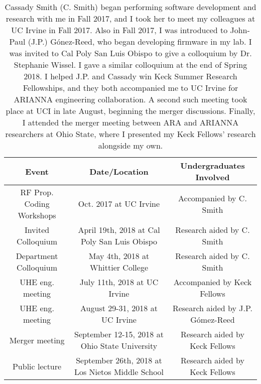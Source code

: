 \documentclass[../../main.tex]{subfiles}
\begin{document}
\begin{table}
\small
\centering
\begin{tabular}{|c|c|c|}
\hline \hline
Event & Date/Location & Undergraduates Involved \\ \hline
RF Prop. Coding Workshops & Oct. 2017 at UC Irvine & Accompanied by C. Smith \\ \hline
Invited Colloquium & April 19th, 2018 at Cal Poly San Luis Obispo & Research aided by C. Smith \\ \hline
Department Colloquium & May 4th, 2018 at Whittier College & Research aided by C. Smith \\ \hline
UHE eng. meeting & July 11th, 2018 at UC Irvine & Accompanied by Keck Fellows \\ \hline
UHE eng. meeting & August 29-31, 2018 at UC Irvine & Research aided by J.P. G\'{o}mez-Reed \\ \hline
Merger meeting & September 12-15, 2018 at Ohio State University & Research aided by Keck Fellows \\ \hline
Public lecture & September 26th, 2018 at Los Nietos Middle School & Research aided by Keck Fellows \\ \hline
\hline
\end{tabular}
\caption{\label{tab:conf} Cassady Smith (C. Smith) began performing software development and research with me in Fall 2017, and I took her to meet my colleagues at UC Irvine in Fall 2017. Also in Fall 2017, I was introduced to John-Paul (J.P.) G\'{o}nez-Reed, who began developing firmware in my lab.  I was invited to Cal Poly San Luis Obispo to give a colloquium by Dr. Stephanie Wissel.  I gave a similar colloquium at the end of Spring 2018.  I helped J.P. and Cassady win Keck Summer Research Fellowships, and they both accompanied me to UC Irvine for ARIANNA engineering collaboration.  A second such meeting took place at UCI in late August, beginning the merger discussions.  Finally, I attended the merger meeting between ARA and ARIANNA researchers at Ohio State, where I presented my Keck Fellows' research alongside my own.}
\end{table}
\end{document}
